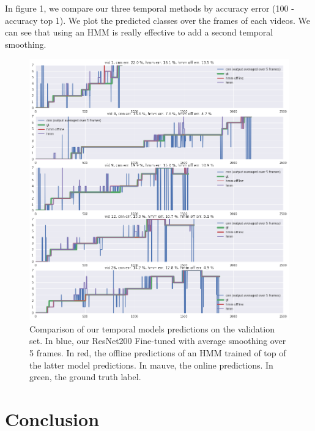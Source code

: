 \documentclass[10pt,twocolumn,letterpaper]{article}
\begin{document}
In figure 1, we compare our three temporal methods by accuracy error (100 - accuracy top 1). We plot the predicted classes over the frames of each videos. We can see that using an HMM is really effective to add a second temporal smoothing.

\begin{figure}
\begin{center}
   \includegraphics[width=1\linewidth]{images/visu.png}
\end{center}
   \caption{Comparison of our temporal models predictions on the validation set. In blue, our ResNet200 Fine-tuned with average smoothing over 5 frames. In red, the offline predictions of an HMM trained of top of the latter model predictions. In mauve, the online predictions. In green, the ground truth label. }
\label{fig:long}
\label{fig:onecol}
\end{figure}



\section{Conclusion}
\end{document}

